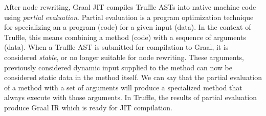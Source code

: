 After node rewriting, Graal JIT compiles Truffle ASTs into native machine code using \textit{partial evaluation}.
Partial evaluation is a program optimization technique for specializing an a program (code) for a given input (data)\cite{futamura:partial-eval}.
In the context of Truffle, this means combining a method (code) with a sequence of arguments (data)\cite{truffle:partial-eval}.
When a Truffle AST is submitted for compilation to Graal, it is considered \textit{stable}, or no longer suitable for node rewriting.
These arguments, previously considered dynamic input supplied to the method can now be considered static data in the method itself.
We can say that the partial evaluation of a method with a set of arguments will produce a specialized method that always execute with those arguments.
In Truffle, the results of partial evaluation produce Graal IR which is ready for JIT compilation.




